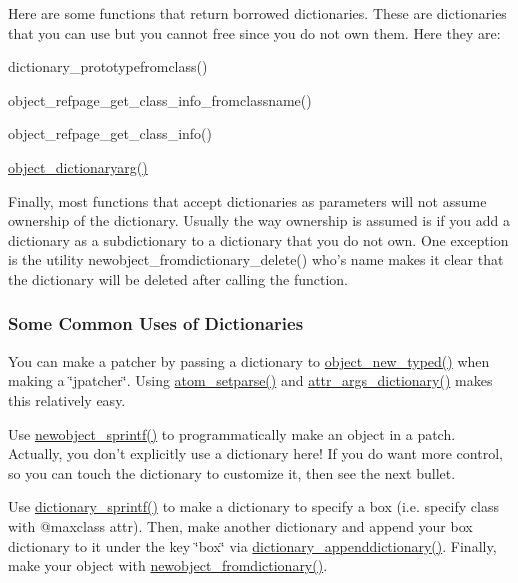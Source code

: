 Here are some functions that return borrowed dictionaries. These are dictionaries that you can use but you cannot free since you do not own them. Here they are: 
\begin{DoxyItemize}
\item dictionary\_\-prototypefromclass()  
\item object\_\-refpage\_\-get\_\-class\_\-info\_\-fromclassname()  
\item object\_\-refpage\_\-get\_\-class\_\-info()  
\item \hyperlink{group__obj_ga6122e56af8de90fa7aad43ee405c6bb6}{object\_\-dictionaryarg()}  
\end{DoxyItemize}

Finally, most functions that accept dictionaries as parameters will not assume ownership of the dictionary. Usually the way ownership is assumed is if you add a dictionary as a subdictionary to a dictionary that you do not own. One exception is the utility newobject\_\-fromdictionary\_\-delete() who's name makes it clear that the dictionary will be deleted after calling the function.\hypertarget{group__dictionary_dictionaries_common_uses}{}\subsubsection{Some Common Uses of Dictionaries}\label{group__dictionary_dictionaries_common_uses}
You can make a patcher by passing a dictionary to \hyperlink{group__obj_ga459c71aca6316e345379eeb424ad56ff}{object\_\-new\_\-typed()} when making a \char`\"{}jpatcher\char`\"{}. Using \hyperlink{group__atom_ga55938aedb41a8f3565680cf29169dc70}{atom\_\-setparse()} and \hyperlink{group__attr_gad9de140db1dba2fe588019866a048bc6}{attr\_\-args\_\-dictionary()} makes this relatively easy.

Use \hyperlink{group__obj_gad81c665a20c3c707decaf3403468ff47}{newobject\_\-sprintf()} to programmatically make an object in a patch. Actually, you don't explicitly use a dictionary here! If you do want more control, so you can touch the dictionary to customize it, then see the next bullet.

Use \hyperlink{group__dictionary_ga77d5bafc260f9fc0bf3b4ad35f2b2629}{dictionary\_\-sprintf()} to make a dictionary to specify a box (i.e. specify class with @maxclass attr). Then, make another dictionary and append your box dictionary to it under the key \char`\"{}box\char`\"{} via \hyperlink{group__dictionary_ga1bd7575368917037f46b5b9076e167c7}{dictionary\_\-appenddictionary()}. Finally, make your object with \hyperlink{group__obj_gaed2c4e1d0c80d929b97ccf07a886faeb}{newobject\_\-fromdictionary()}.


